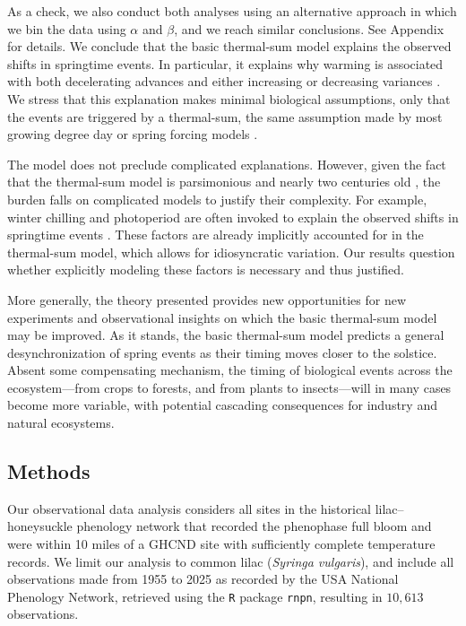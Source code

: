 \documentclass[
]{article}
\begin{document}
As a check, we also conduct both analyses using an alternative approach in which we bin the data using $\alpha$ and $\beta$, and we reach similar conclusions. See Appendix for details. We conclude that the basic thermal-sum model explains the observed shifts in springtime events. In particular, it explains why warming is associated with both decelerating advances  %
and either increasing or decreasing variances \citep{vitasse2018global, fu2015declining, stemkovski2023disorder}. We stress that this explanation makes minimal biological assumptions, only that the events are triggered by a thermal-sum, the same assumption made by most growing degree day or spring forcing models \citep{schwartzbook}. 

The model does not preclude complicated explanations. However, given the fact that the thermal-sum model is parsimonious and nearly two centuries old \citep{quetelet1849letters}, the burden falls on complicated models to justify their complexity. For example, winter chilling and photoperiod are often invoked to explain the observed shifts in springtime events \citep{fu2015declining}. These factors are already implicitly accounted for in the thermal-sum model, which allows for idiosyncratic variation. %
 Our results question whether explicitly modeling these factors is necessary and thus justified.

More generally, the theory presented provides new opportunities for new experiments and observational insights on which the basic thermal-sum model may be improved. As it stands, the basic thermal-sum model predicts a general desynchronization of spring events as their timing moves closer to the solstice. Absent some compensating mechanism, the timing of biological events across the ecosystem---from crops to forests, and from plants to insects---will in many cases become more variable, with potential cascading consequences for industry and natural ecosystems.


\subsection{Methods}\label{methods}

Our observational data analysis considers all sites in the historical lilac--honeysuckle phenology network \citep{rosemartin2015lilac} that recorded the phenophase full bloom and were within 10 miles of a GHCND site with sufficiently complete temperature records. We limit our analysis to common lilac (\textit{Syringa vulgaris}), and include all observations made from 1955 to 2025 as recorded by the USA National Phenology Network, retrieved using the \texttt{R} package \texttt{rnpn}, resulting in \(10,613\) observations. 
\end{document}
